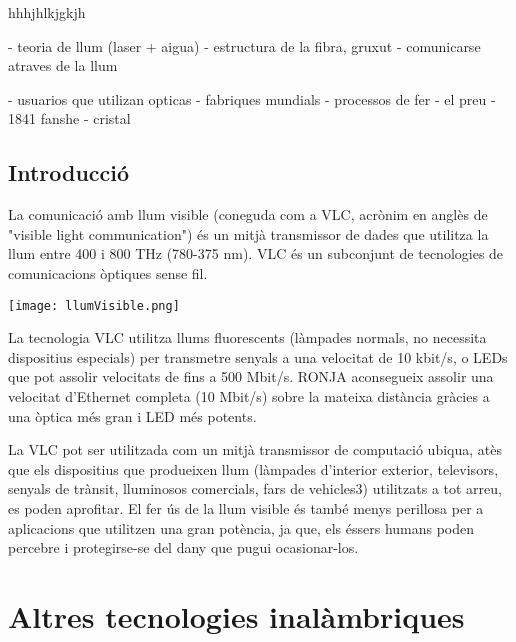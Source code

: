 

hhhjhlkjgkjh

- teoria de llum (laser + aigua)
- estructura de la fibra, gruxut
- comunicarse atraves de la llum

- usuarios que utilizan opticas
- fabriques mundials
- processos de fer
- el preu
- 1841 fanshe
- cristal

\subsection*{Introducció}
La comunicació amb llum visible (coneguda com a VLC, acrònim en anglès de "visible light communication") és un mitjà transmissor de dades que utilitza la llum entre 400 i 800 THz (780-375 nm). VLC és un subconjunt de tecnologies de comunicacions òptiques sense fil.



\begin{center}
    \texttt{[image: llumVisible.png]}\\\vfill
\end{center}

La tecnologia  VLC utilitza llums fluorescents (làmpades normals, no necessita dispositius especials) per transmetre senyals a una velocitat de 10 kbit/s, o LEDs que pot assolir velocitats de fins a 500 Mbit/s. RONJA aconsegueix assolir una velocitat d'Ethernet completa (10 Mbit/s) sobre la mateixa distància gràcies a una òptica més gran i LED més potents.

La VLC pot ser utilitzada com un mitjà transmissor de computació ubiqua, atès que els dispositius que produeixen llum (làmpades d'interior exterior, televisors, senyals de trànsit, lluminosos comercials, fars de vehicles3) utilitzats a tot arreu, es poden aprofitar. El fer ús de la llum visible és també menys perillosa per a aplicacions que utilitzen una gran potència, ja que, els éssers humans poden percebre i protegirse-se del dany que pugui ocasionar-los.






\section*{Altres tecnologies inalàmbriques}

